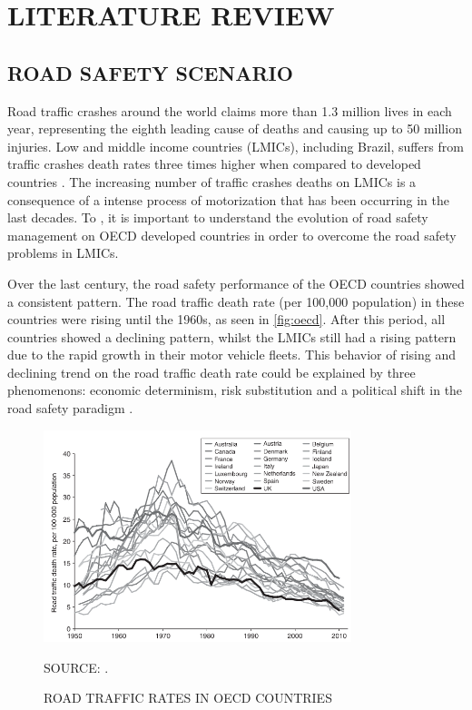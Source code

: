 

\chapter{LITERATURE REVIEW}


\section{ROAD SAFETY SCENARIO}

Road traffic crashes around the world claims more than 1.3 million lives in each year, representing the eighth leading cause of deaths and causing up to 50 million injuries. Low and middle income countries (LMICs), including Brazil, suffers from traffic crashes death rates three times higher when compared to developed countries \cite{WHO2018}. The increasing number of traffic crashes deaths on LMICs is a consequence of a intense process of motorization that has been occurring in the last decades. To \textcite{Bhalla2016}, it is important to understand the evolution of road safety management on OECD developed countries in order to overcome the road safety problems in LMICs. 

Over the last century, the road safety performance of the OECD countries showed a consistent pattern. The road traffic death rate (per 100,000 population) in these countries were rising until the 1960s, as seen in \autoref{fig:oecd}. After this period, all countries showed a declining pattern, whilst the LMICs still had a rising pattern due to the rapid growth in their motor vehicle fleets. This behavior of rising and declining trend on the road traffic death rate could be explained by three phenomenons: economic determinism, risk substitution and a political shift in the road safety paradigm \cite{Bhalla2016}.

\begin{figure}[!htbp]
    \centering\footnotesize
    \captionsetup{font=footnotesize}
    \caption{ROAD TRAFFIC RATES IN OECD COUNTRIES}
    \includegraphics[width=0.8\textwidth]{fig/oecd.png}
    \label{fig:oecd}
    \par SOURCE: \textcite{Bhalla2016}.
\end{figure}

